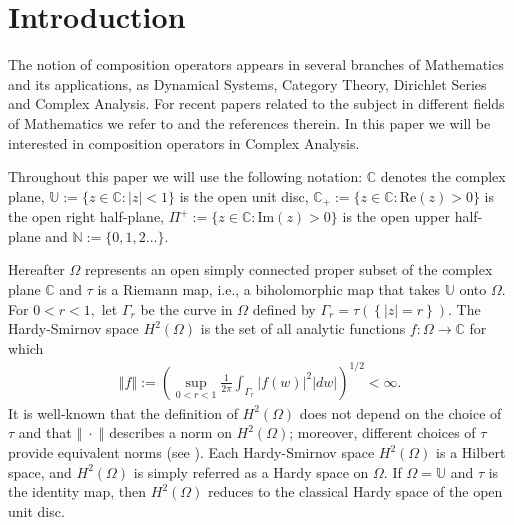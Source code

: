 \documentclass[11pt]{amsart}%
\theoremstyle{definition}
\theoremstyle{remark}
\numberwithin{equation}{section}
\begin{document}
\section{Introduction}

The notion of composition operators appears in several branches of Mathematics
and its applications, as Dynamical Systems, Category Theory, Dirichlet Series
and Complex Analysis. For recent papers related to the subject in different
fields of Mathematics we refer to \cite{bs, Galindo, jge, le} and the
references therein. In this paper we will be interested in composition
operators in Complex Analysis. 


Throughout this paper we will use the following notation: $\mathbb{C}$ denotes
the complex plane, $\mathbb{U}:=\{z\in\mathbb{C}:|z|<1\}$ is the open
unit disc, $\mathbb{C}_{+}:=\{z\in\mathbb{C}:\mathrm{Re}(z)>0\}$ is the open
right half-plane, $\Pi^{+}:=\{z\in\mathbb{C}:\mathrm{Im}(z)>0\}$ is the
open upper half-plane and $\mathbb{N}:=\{0,1,2\ldots\}.$

Hereafter $\Omega$ represents an open simply connected proper subset of the complex plane $\mathbb{C}$ and $\tau$ is a Riemann map, i.e., a biholomorphic
map that takes $\mathbb{U}$ onto $\Omega.$ For $0<r<1,$ let $\Gamma_{r}$ be
the curve in $\Omega$ defined by $\Gamma_{r}=\tau\left(  \left\{
|z|=r\right\}  \right) .$ The Hardy-Smirnov space $H^{2}(\Omega)$ is the set
of all analytic functions $f:\Omega\longrightarrow\mathbb{C}$ for which
\begin{align*}
\left\Vert f\right\Vert :=\left(  \sup_{0<r<1}\frac{1}{2\pi}%
\int_{\Gamma_{r}}|f(w)|^{2}|dw|\right)  ^{1/2}<\infty.
\end{align*}
It is well-known that the definition of $H^{2}(\Omega)$ does not
depend on the choice of $\tau$ and that $\left\Vert \; \cdot \;\right\Vert$ describes a
norm on $H^{2}(\Omega)$; moreover, different choices of $\tau$ provide
equivalent norms (see \cite[p. 63]{Shapiro-Smith}). Each Hardy-Smirnov space
$H^{2}(\Omega)$ is a Hilbert space, and $H^{2}(\Omega)$ is simply referred as
a Hardy space on $\Omega.$ If $\Omega=\mathbb{U}$ and $\tau$ is the identity
map, then $H^{2}(\Omega)$ reduces to the classical Hardy space of the open
unit disc.
\end{document}
